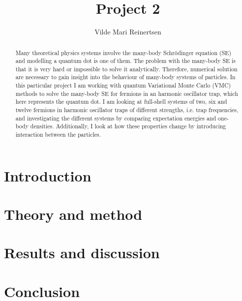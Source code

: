 \documentclass[a4paper,12pt]{article}
\date{}
\author{Vilde Mari Reinertsen}
\title{Project 2}
\begin{document}
\begingroup
\let\center\flushleft
\let\endcenter\endflushleft
\maketitle
\endgroup

\begin{abstract}
Many theoretical physics systems involve the many-body Schrödinger equation (SE) and modelling a quantum dot is one of them. The problem with the many-body SE is that it is very hard or impossible to solve it analytically. Therefore, numerical solution are necessary to gain insight into the behaviour of many-body systems of particles. In this particular project I am working with quantum Variational Monte Carlo (VMC) methods to solve the many-body SE for fermions in an harmonic oscillator trap, which here represents the quantum dot. I am looking at full-shell systems of two, six and twelve fermions in harmonic oscillator traps of different strengths, i.e. trap frequencies, and investigating the different systems by comparing expectation energies and one-body densities. Additionally, I look at how these properties change by introducing interaction between the particles. 
\end{abstract}

\tableofcontents

\section{Introduction}


\section{Theory and method}


\section{Results and discussion}


\section{Conclusion}


\begin{appendices}

\end{appendices}


\newpage

\end{document}
